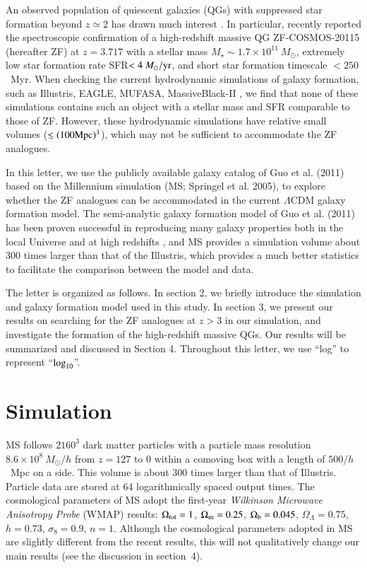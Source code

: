 \documentclass[useAMS,usenatbib]{mn2e}
\begin{document}
An observed population of quiescent galaxies (QGs) with suppressed star formation beyond $z\simeq 2$  has drawn much interest \citep[e.g.,][]{Labbe05,Daddi05,Kriek08a,Kriek08b,Kriek09,Fontana09,Straatman14,Nayyeri14,Bell15,Kriek16,Strazzullo16,Kado-Fong17}. In particular, \cite{Glazebrook17} recently reported the spectroscopic confirmation of a high-redshift massive QG ZF-COSMOS-20115 (hereafter ZF) at $z=3.717$ with a stellar mass $M_{\star}\sim 1.7\times 10^{11}\ M_{\odot}$, extremely low star formation rate SFR$<4\ M_{\odot}/\rm{yr}$, and short star formation timescale $<250$~Myr. When checking the current hydrodynamic simulations of galaxy formation, such as Illustris, EAGLE, MUFASA, MassiveBlack-II \citep{Wellons15,Park15,Dave16}, we find that none of these simulations contains such an object with a stellar mass and SFR comparable to those of ZF. However, these hydrodynamic simulations have relative small volumes ($\lesssim (100\rm{Mpc})^3$), which may not be sufficient to accommodate the ZF analogues. 

In this letter, we use the publicly available galaxy catalog of Guo et al. (2011) based on the Millennium simulation (MS; Springel et al. 2005), to explore whether the ZF analogues can be accommodated in the current $\Lambda$CDM galaxy formation model. The semi-analytic galaxy formation model of Guo et al. (2011) has been proven successful in reproducing many galaxy properties both in the local Universe and at high redshifts \citep[e.g.,][]{Guo11,Yates12,Guo13,Xie15,Buitrago17,Rong17}, and MS provides a simulation volume about 300 times larger than that of the Illustris, which provides a much better statistics to facilitate the comparison between the model and data.  

The letter is organized as follows. In section 2, we briefly introduce the simulation and galaxy formation model used in this study. In section 3, we present our results on searching for the ZF analogues at $z>3$ in our simulation, and investigate the formation of the high-redshift massive QGs. Our results will be summarized and discussed in Section 4. Throughout this letter, we use ``log'' to represent ``$\rm{log}_{10}$''. 



\section{Simulation}

MS follows $2160^3$ dark matter particles with a particle mass resolution $8.6\times 10^8\ M_{\odot}/h$ from $z=127$ to 0 within a comoving box with a length of $500/h$~Mpc on a side. This volume is about $300$ times larger than that of Illustris. Particle data are stored at 64 logarithmically spaced output times. The cosmological parameters of MS adopt the first-year {\it {Wilkinson Microwave Anisotropy Probe}} (WMAP) results: $\Omega_{\rm{tot}}=1$, $\Omega_{\rm{m}}=0.25$, $\Omega_{\rm{b}}=0.045$, $\Omega_{\Lambda}=0.75$, $h=0.73$, $\sigma_8=0.9$, $n=1$. Although the cosmological parameters adopted in MS are slightly different from the recent results, this will not qualitatively change our main results (see the discussion in section~4).  
\end{document}
